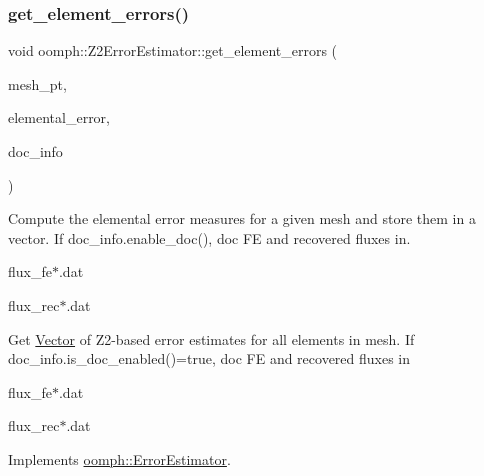 \mbox{\label{classoomph_1_1Z2ErrorEstimator_ae0fd03123c518ed340bb534c2f6b8cc4}} 
\subsubsection{\texorpdfstring{get\+\_\+element\+\_\+errors()}{get\_element\_errors()}\hspace{0.1cm}{\footnotesize\ttfamily [2/2]}}
{\footnotesize\ttfamily void oomph\+::\+Z2\+Error\+Estimator\+::get\+\_\+element\+\_\+errors (\begin{DoxyParamCaption}\item[{\hyperlink{classoomph_1_1Mesh}{Mesh} $\ast$\&}]{mesh\+\_\+pt,  }\item[{\hyperlink{classoomph_1_1Vector}{Vector}$<$ double $>$ \&}]{elemental\+\_\+error,  }\item[{\hyperlink{classoomph_1_1DocInfo}{Doc\+Info} \&}]{doc\+\_\+info }\end{DoxyParamCaption})\hspace{0.3cm}{\ttfamily [virtual]}}



Compute the elemental error measures for a given mesh and store them in a vector. If doc\+\_\+info.\+enable\+\_\+doc(), doc FE and recovered fluxes in. 


\begin{DoxyItemize}
\item flux\+\_\+fe$\ast$.dat
\item flux\+\_\+rec$\ast$.dat
\end{DoxyItemize}

Get \hyperlink{classoomph_1_1Vector}{Vector} of Z2-\/based error estimates for all elements in mesh. If doc\+\_\+info.\+is\+\_\+doc\+\_\+enabled()=true, doc FE and recovered fluxes in
\begin{DoxyItemize}
\item flux\+\_\+fe$\ast$.dat
\item flux\+\_\+rec$\ast$.dat 
\end{DoxyItemize}

Implements \hyperlink{classoomph_1_1ErrorEstimator_a77e85262d309d6e7da0ca71e98b7afff}{oomph\+::\+Error\+Estimator}.



